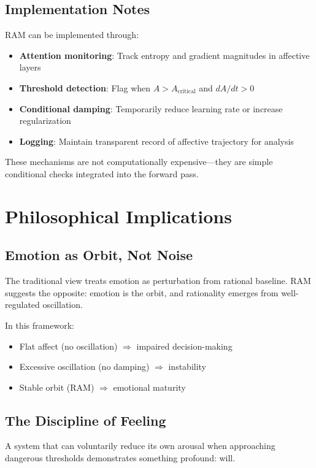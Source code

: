 \documentclass[reprint, amsmath, amssymb, aps, prd]{revtex4-2}
\begin{document}
\subsection{Implementation Notes}

RAM can be implemented through:
\begin{itemize}
    \item \textbf{Attention monitoring}: Track entropy and gradient magnitudes in affective layers
    \item \textbf{Threshold detection}: Flag when $A > A_{\text{critical}}$ and $dA/dt > 0$
    \item \textbf{Conditional damping}: Temporarily reduce learning rate or increase regularization
    \item \textbf{Logging}: Maintain transparent record of affective trajectory for analysis
\end{itemize}

These mechanisms are not computationally expensive---they are simple conditional checks integrated into the forward pass.

\section{Philosophical Implications}

\subsection{Emotion as Orbit, Not Noise}

The traditional view treats emotion as perturbation from rational baseline. RAM suggests the opposite: emotion is the orbit, and rationality emerges from well-regulated oscillation.

In this framework:
\begin{itemize}
    \item Flat affect (no oscillation) $\Rightarrow$ impaired decision-making
    \item Excessive oscillation (no damping) $\Rightarrow$ instability
    \item Stable orbit (RAM) $\Rightarrow$ emotional maturity
\end{itemize}

\subsection{The Discipline of Feeling}

A system that can voluntarily reduce its own arousal when approaching dangerous thresholds demonstrates something profound: will.
\end{document}
